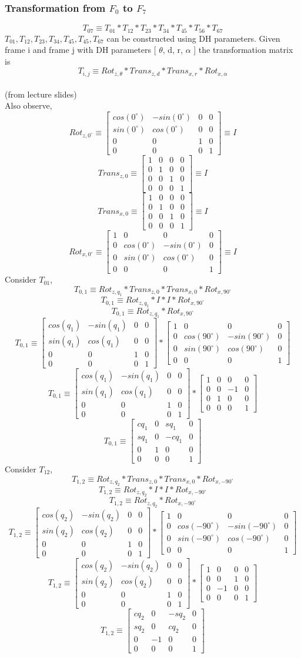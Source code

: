 \documentclass[12pt]{article}
\newcommand{\fromlectures}{{\\ \color{blue} \hspace*{\fill}(from lecture slides)} \\}
\newcommand{\rx}[1]{\begin{bmatrix} 1 & 0 & 0 & 0 \\ 0 & cos(#1) & -sin(#1) & 0 \\ 0 & sin(#1) & cos(#1) & 0 \\ 0 & 0 & 0 & 1 \end{bmatrix}}
\newcommand{\rz}[1]{\begin{bmatrix} cos(#1) & -sin(#1) & 0 & 0 \\ sin(#1) & cos(#1) & 0 & 0 \\ 0 & 0 & 1 & 0 \\ 0 & 0 & 0 & 1 \end{bmatrix}}
\newcommand{\trans}[3]{\begin{bmatrix} 1 & 0 & 0 & #1 \\ 0 & 1 & 0 & #2 \\ 0 & 0 & 1 & #3 \\ 0 & 0 & 0 & 1 \end{bmatrix}}
\begin{document}
\subsubsection*{Transformation from $F_0$ to $F_7$}
\[
  T_{07} \equiv
  T_{01}
  * T_{12}
  * T_{23}
  * T_{34}
  * T_{45}
  * T_{56}
  * T_{67}
\]
$T_{01}, T_{12}, T_{23}, T_{34}, T_{45}, T_{45}, T_{67}$ can be constructed using DH parameters.
Given frame i and frame j with DH parameters [ $\theta$, d, r, $\alpha$ ] the transformation matrix is
\[
  T_{i,j} \equiv Rot_{z,\theta} * Trans_{z, d} * Trans_{x, r} * Rot_{x, \alpha}
\]
\fromlectures
Also observe,
\[
  Rot_{z, 0^{\circ}} \equiv \rz{0^{\circ}} \equiv I
\]
\[
  Trans_{z, 0} \equiv \trans{0}{0}{0} \equiv I
\]
\[
  Trans_{x, 0} \equiv \trans{0}{0}{0} \equiv I
\]
\[
  Rot_{x, 0^{\circ}} \equiv \rx{0^{\circ}} \equiv I
\]
Consider $T_{01}$,
\[
  T_{0,1} \equiv Rot_{z,q_1} * Trans_{z, 0} * Trans_{x, 0} * Rot_{x, 90^{\circ}}
\]
\[
  T_{0,1} \equiv Rot_{z,q_1} * I * I * Rot_{x, 90^{\circ}}
\]
\[
  T_{0,1} \equiv Rot_{z,q_1} * Rot_{x, 90^{\circ}}
\]
\[
  T_{0,1} \equiv \rz{q_1} * \rx{90^{\circ}}
\]
\[
  T_{0,1} \equiv
  \rz{q_1}
  *
  \begin{bmatrix} 1 & 0 & 0 & 0 \\ 0 & 0 & -1 & 0 \\ 0 & 1 & 0 & 0 \\ 0 & 0 & 0 & 1 \end{bmatrix}
\]
\[
  T_{0,1} \equiv
  \begin{bmatrix} cq_1 & 0 & sq_1 & 0 \\ sq_1 & 0 & -cq_1 & 0 \\ 0 & 1 & 0 & 0 \\ 0 & 0 & 0 & 1 \end{bmatrix}
\]
Consider $T_{12}$,
\[
  T_{1,2} \equiv Rot_{z,q_2} * Trans_{z, 0} * Trans_{x, 0} * Rot_{x, -90^{\circ}}
\]
\[
  T_{1,2} \equiv Rot_{z,q_2} * I * I * Rot_{x, -90^{\circ}}
\]
\[
  T_{1,2} \equiv Rot_{z,q_2} * Rot_{x, -90^{\circ}}
\]
\[
  T_{1,2} \equiv \rz{q_2} * \rx{-90^{\circ}}
\]
\[
  T_{1,2} \equiv
  \rz{q_2}
  *
  \begin{bmatrix} 1 & 0 & 0 & 0 \\ 0 & 0 & 1 & 0 \\ 0 & -1 & 0 & 0 \\ 0 & 0 & 0 & 1 \end{bmatrix}
\]
\[
  T_{1,2} \equiv
  \begin{bmatrix} cq_2 & 0 & -sq_2 & 0 \\ sq_2 & 0 & cq_2 & 0 \\ 0 & -1 & 0 & 0 \\ 0 & 0 & 0 & 1 \end{bmatrix}
\]
\end{document}
